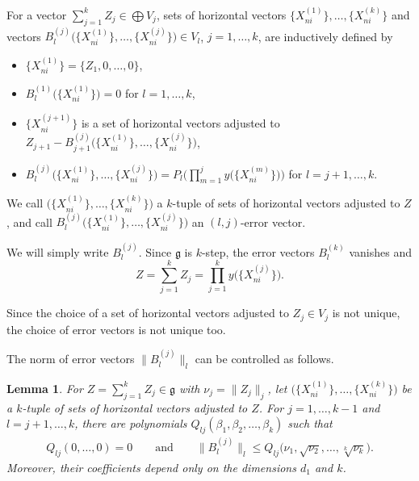 \documentclass[10pt,a4paper]{amsart}
\numberwithin{equation}{section}
\newtheorem{Lemma}[Theorem]{Lemma}
\newcommand{\g}{\mathfrak{g}}
\begin{document}
\begin{Definition}
 For a vector $\sum_{j=1}^k Z_j\in\bigoplus V_j$,
 sets of horizontal vectors $\bigl\{X_{ni}^{(1)}\bigr\},\dots,\bigl\{X_{ni}^{(k)}\bigr\}$ and vectors $B_l^{(j)}\bigl(\bigl\{X_{ni}^{(1)}\bigr\},\dots,\bigl\{X_{ni}^{(j)}\bigr\}\bigr)\in V_l$, $j=1,\dots,k$, are inductively defined by
 \begin{itemize}\itemsep=0pt
 \item[(X1)] $\bigl\{X_{ni}^{(1)}\bigr\}=\{Z_1,0,\dots,0\}$,
 \item[(B1)] $B_l^{(1)}\bigl(\bigl\{X_{ni}^{(1)}\bigr\}\bigr)=0$ for $l=1,\dots,k$,
 \item[(Xj)] $\bigl\{X_{ni}^{(j+1)}\bigr\}$ is a set of horizontal vectors adjusted to $Z_{j+1}-B_{j+1}^{(j)}\big(\bigl\{X_{ni}^{(1)}\bigr\},\dots,\bigl\{X_{ni}^{(j)}\bigr\}\big)$,
 \item[(Bj)] $B_l^{(j)}\big(\bigl\{X_{ni}^{(1)}\bigr\},\dots,\bigl\{X_{ni}^{(j)}\bigr\}\big) =P_l\big(\prod_{m=1}^jy\big(\bigl\{X_{ni}^{(m)}\bigr\}\big)\big)$ for $l=j+1,\dots,k$.
 \end{itemize}
 We call $\big(\bigl\{X_{ni}^{(1)}\bigr\},\dots,\bigl\{X_{ni}^{(k)}\bigr\}\big)$ a $k$-tuple of sets of horizontal vectors adjusted to $Z$,
 and call $B_{l}^{(j)}\big(\bigl\{X_{ni}^{(1)}\bigr\},\dots,\bigl\{X_{ni}^{(j)}\bigr\}\big)$ an $(l,j)$-error vector.
\end{Definition}

We will simply write $B_l^{(j)}$.
Since $\g$ is $k$-step,
the error vectors $B_l^{(k)}$ vanishes and
\[
Z=\sum_{j=1}^k Z_j=\prod_{j=1}^ky\big(\bigl\{X_{ni}^{(j)}\bigr\}\big).
\]

\begin{Remark}
 Since the choice of a set of horizontal vectors adjusted to $Z_j\in V_j$ is not unique,
 the choice of error vectors is not unique too.
\end{Remark}

The norm of error vectors $\big\|B_l^{(j)}\big\|_l$ can be controlled as follows.

\begin{Lemma}\label{lempolynomial}
 For $Z=\sum_{j=1}^k Z_j\in\g$ with $\nu_j=\|Z_j\|_j$,
 let $\big(\bigl\{X_{ni}^{(1)}\bigr\},\dots,\bigl\{X_{ni}^{(k)}\bigr\}\big)$ be a $k$-tuple of sets of horizontal vectors adjusted to $Z$.
 For $j=1,\dots,k-1$ and $l=j+1,\dots,k$,
 there are polynomials $Q_{lj}(\beta_1,\beta_2,\dots,\beta_k)$ such that
 \begin{gather*}
 Q_{lj}(0,\dots,0)=0\qquad \text{and}\qquad
 \bigl\|B_l^{(j)}\bigr\|_l\leq Q_{lj}\big(\nu_1,\sqrt{\nu_2},\dots,\sqrt[k]{\nu_k}\big).
 \end{gather*}
 Moreover, their coefficients depend only on the dimensions $d_1$ and $k$.
\end{Lemma}
\end{document}
